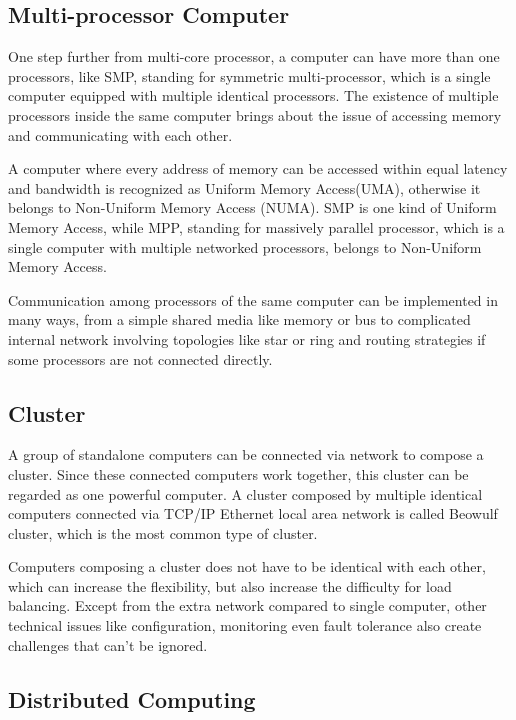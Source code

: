 \documentclass[12pt,a4]{report}
\begin{document}
\subsection{Multi-processor Computer}

One step further from multi-core processor, a computer can have more than one processors, like SMP, standing for symmetric multi-processor, which is a single computer equipped with multiple identical processors. The existence of multiple processors inside the same computer brings about the issue of accessing memory and communicating with each other.

A computer where every address of memory can be accessed within equal latency and bandwidth is recognized as Uniform Memory Access(UMA), otherwise it belongs to Non-Uniform Memory Access (NUMA). SMP is one kind of Uniform Memory Access, while MPP, standing for massively parallel processor, which is a single computer with multiple networked processors, belongs to Non-Uniform Memory Access.

Communication among processors of the same computer can be implemented in many ways, from a simple shared media like memory or bus to complicated internal network involving topologies like star or ring and routing strategies if some processors are not connected directly.

\subsection{Cluster}

A group of standalone computers can be connected via network to compose a cluster. Since these connected computers work together, this cluster can be regarded as one powerful computer. A cluster composed by multiple identical computers connected via TCP/IP Ethernet local area network is called Beowulf cluster, which is the most common type of cluster.

Computers composing a cluster does not have to be identical with each other, which can increase the flexibility, but also increase the difficulty for load balancing. Except from the extra network compared to single computer, other technical issues like configuration, monitoring even fault tolerance also create challenges that can't be ignored.

\subsection{Distributed Computing}
\end{document}
